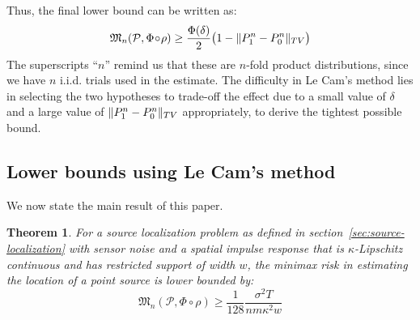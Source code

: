 \documentclass[conference]{IEEEtran}
\DeclarePairedDelimiter\norm{\lVert}{\rVert}
\newcommand{\Phiorho}{\Phi\!\circ\!\rho}
\newtheorem{theorem}{Theorem}
\begin{document}
Thus, the final lower bound can be written as:
\begin{equation} \label{eq:le-cam-bound}
	\mathfrak{M}_n(\mathcal P, \Phiorho) \geq \frac{\Phi(\delta)}{2} \big(1 - \norm{P_1^n - P_0^n}_{TV}\big)
\end{equation}
The superscripts ``$n$'' remind us that these are $n$-fold product
distributions, since we have $n$ i.i.d. trials used in the estimate.  The
difficulty in Le Cam's method lies in selecting the two hypotheses to trade-off
the effect due to a small value of $\delta$ and a large value of $\norm{P_1^n -
P_0^n}_{TV}$ appropriately, to derive the tightest possible bound.

\subsection{Lower bounds using Le Cam's method}

We now state the main result of this paper.
\begin{theorem}
	For a source localization problem as defined in
	section~\ref{sec:source-localization} with sensor noise and a spatial
	impulse response that is $\kappa$-Lipschitz continuous and has restricted
	support of width $w$, the minimax risk in estimating the location of a
	point source is lower bounded by:
	\begin{equation}
		\mathfrak{M}_n(\mathcal{P}, \Phiorho) \geq \frac{1}{128} \frac{\sigma^2 T}{nm\kappa^2w}
	\end{equation}
\end{theorem}
\end{document}

